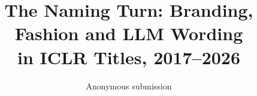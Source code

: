 \documentclass[11pt]{article}
\title{The Naming Turn: Branding, Fashion and LLM Wording\\in ICLR Titles, 2017--2026}
\author{Anonymous submission}
\begin{document}
\maketitle













\clearpage
\onecolumn
\appendix

\end{document}
